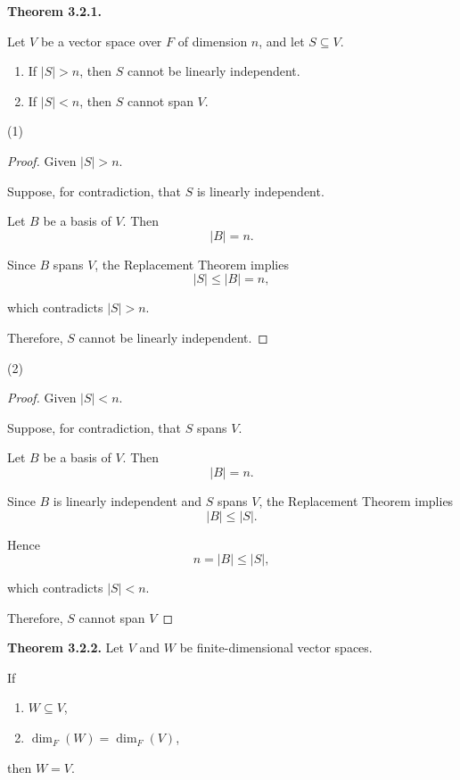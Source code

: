 \documentclass[12pt]{article}
\begin{document}
\textbf{Theorem 3.2.1.}

Let $V$ be a vector space over $F$ of dimension $n$, and let
$S\subseteq V$.

\begin{enumerate}
    \item If $|S|>n$, then $S$ cannot be linearly independent.

    \item If $|S|<n$, then $S$ cannot span $V$.
\end{enumerate}

(1)
\begin{proof}

Given $|S|>n$.

Suppose, for contradiction, that $S$ is linearly independent.

Let $B$ be a basis of $V$. Then
\[
|B|=n.
\]

Since $B$ spans $V$, the Replacement Theorem implies
\[
|S|\le |B|=n,
\]

which contradicts $|S|>n$.

Therefore, $S$ cannot be linearly independent.

\end{proof}

(2)
\begin{proof}
Given $|S|<n$.

Suppose, for contradiction, that $S$ spans $V$.

Let $B$ be a basis of $V$. Then
\[
|B|=n.
\]

Since $B$ is linearly independent and $S$ spans $V$, the Replacement Theorem implies
\[
|B|\le |S|.
\]

Hence
\[
n=|B|\le |S|,
\]

which contradicts $|S|<n$.

Therefore, $S$ cannot span $V$
\end{proof}

\newpage

\textbf{Theorem 3.2.2.}
Let $V$ and $W$ be finite-dimensional vector spaces.

If
\begin{enumerate}
    \item $W\subseteq V$,
    \item $\dim_F(W)=\dim_F(V)$,
\end{enumerate}

then $W=V.$
\end{document}
